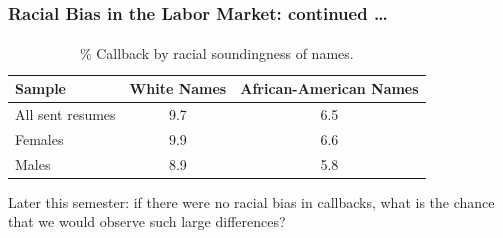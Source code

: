 \begin{frame}
  \frametitle{Racial Bias in the Labor Market: continued \dots}
  \framesubtitle{ \href{https://www.jstor.org/stable/3592802}{}}

  \begin{table}
  \begin{tabular}{lcc}
    \hline \hline
    Sample & White Names & African-American Names \\ 
    \hline
     All sent resumes & 9.7 & 6.5 \\
    Females & 9.9 & 6.6\\ 
    Males & 8.9 & 5.8\\
    \hline
    \end{tabular}

    \caption{\% Callback by racial soundingness of names.}
  \end{table}


  \alert{Later this semester: if there were no racial bias in callbacks, what is the chance that we would observe such large differences?}
\end{frame}
%
%
%
